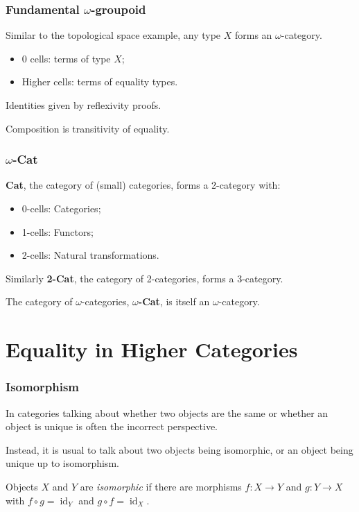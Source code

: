\documentclass[presentation]{beamer}
\DeclareMathOperator{\id}{id}
\begin{document}
\begin{frame}
  \frametitle{Fundamental \(\omega\)-groupoid}
  Similar to the topological space example, any type \(X\) forms an \(\omega\)-category.

  \pause{}
  \begin{itemize}
  \item 0 cells: terms of type \(X\);
  \item Higher cells: terms of equality types.
  \end{itemize}

  \pause{}
  Identities given by reflexivity proofs.

  \pause{}
  Composition is transitivity of equality.
\end{frame}

\begin{frame}
  \frametitle{\(\omega\)-\textbf{Cat}}
  \textbf{Cat}, the category of (small) categories, forms a 2-category with:
  \begin{itemize}
  \item 0-cells: Categories;
  \item 1-cells: Functors;
  \item 2-cells: Natural transformations.
  \end{itemize}

  \pause{}
  Similarly \textbf{2-Cat}, the category of 2-categories, forms a 3-category.

  \pause{}
  The category of \(\omega\)-categories, \textbf{\(\omega\)-Cat}, is itself an \(\omega\)-category.
\end{frame}

\section{Equality in Higher Categories}

\begin{frame}
  \frametitle{Isomorphism}
  In categories talking about whether two objects are the same or whether an object is unique is often the incorrect perspective.

  \pause{}
  Instead, it is usual to talk about two objects being isomorphic, or an object being unique up to isomorphism.
  \begin{definition}
    Objects \(X\) and \(Y\) are \emph{isomorphic} if there are morphisms \(f : X \to Y\) and \(g : Y \to X\) with \(f \circ g = \id_Y\) and \(g \circ f = \id_X\).
  \end{definition}
\end{frame}
\end{document}
